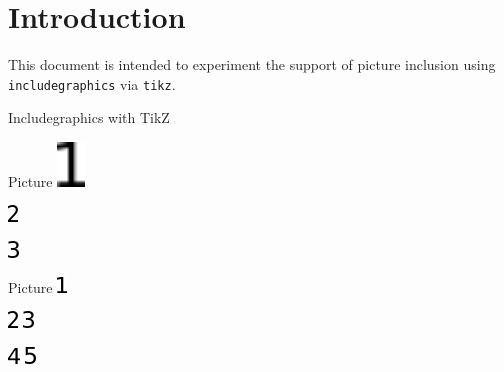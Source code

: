 \documentclass{article}
\begin{document}
\section*{Introduction}

This document is intended to experiment the support of picture inclusion using 
\texttt{includegraphics} via \texttt{tikz}.

\begin{quiz}{Includegraphics with TikZ}

\begin{multi}{Picture}
\includegraphics[width=2em,angle=90]{fig/1.png}
\item* \includegraphics[scale=.5]{fig/2.png}
\item \includegraphics{fig/3.png}
\end{multi}

\graphicspath{{./fig/}}
\begin{matching}[dd]{Picture}
\includegraphics{1.png}
\item \includegraphics[angle=45]{2.png} \answer \includegraphics{3.png}
\item \includegraphics[angle=-45]{4.png} \answer 
\includegraphics{5.png}
\end{matching}

\end{quiz}
\end{document}
